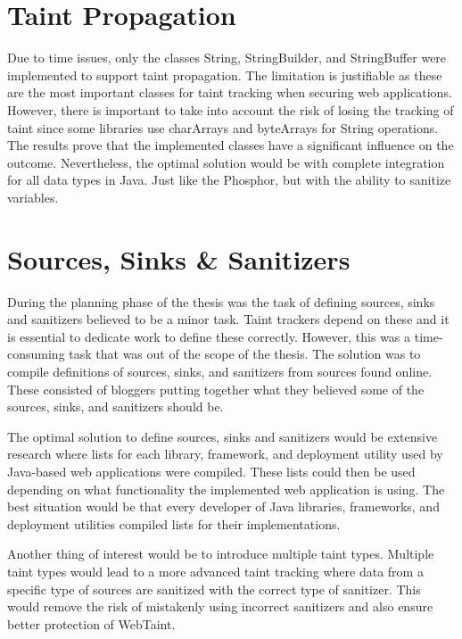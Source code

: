 \section{Taint Propagation}
\label{propagation}
Due to time issues, only the classes String, StringBuilder, and StringBuffer were implemented to support taint propagation. The limitation is justifiable as these are the most important classes for taint tracking when securing web applications. However, there is important to take into account the risk of losing the tracking of taint since some libraries use charArrays and byteArrays for String operations. The results prove that the implemented classes have a significant influence on the outcome. Nevertheless, the optimal solution would be with complete integration for all data types in Java. Just like the Phosphor, but with the ability to sanitize variables.



\section{Sources, Sinks \& Sanitizers}
\label{sss}
During the planning phase of the thesis was the task of defining sources, sinks and sanitizers believed to be a minor task. Taint trackers depend on these and it is essential to dedicate work to define these correctly. However, this was a time-consuming task that was out of the scope of the thesis. The solution was to compile definitions of sources, sinks, and sanitizers from sources found online. These consisted of bloggers putting together what they believed some of the sources, sinks, and sanitizers should be.

The optimal solution to define sources, sinks and sanitizers would be extensive research where lists for each library, framework, and deployment utility used by Java-based web applications were compiled. These lists could then be used depending on what functionality the implemented web application is using. The best situation would be that every developer of Java libraries, frameworks, and deployment utilities compiled lists for their implementations.

Another thing of interest would be to introduce multiple taint types. Multiple taint types would lead to a more advanced taint tracking where data from a specific type of sources are sanitized with the correct type of sanitizer. This would remove the risk of mistakenly using incorrect sanitizers and also ensure better protection of WebTaint.



